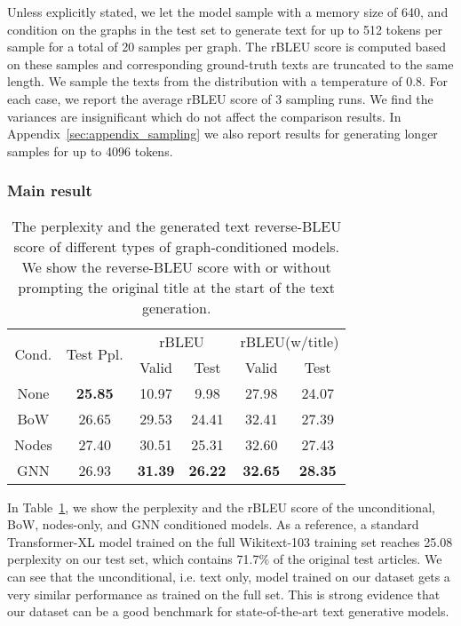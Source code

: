 \documentclass[11pt]{article}
\begin{document}
Unless explicitly stated, we let the model sample with a memory size of 640, and condition on the graphs in the test set to generate text for up to 512 tokens per sample for a total of 20 samples per graph.
The rBLEU score is computed based on these samples and corresponding ground-truth texts are truncated to the same length.  We sample the texts from the distribution with a temperature of 0.8.  For each case, we report the average rBLEU score of 3 sampling runs. We find the variances are insignificant which do not affect the comparison results. In Appendix~\ref{sec:appendix_sampling} we also report results for generating longer samples for up to 4096 tokens.


\subsubsection{Main result}



\begin{table}[t]
    \centering
    \setlength{\tabcolsep}{5pt}
    \begin{tabular}{c|c|c|c|c|c}
    \hline
        \multirow{2}{2em}{Cond.} & \multirow{2}{2em}{Test Ppl.} & \multicolumn{2}{c|}{rBLEU} & \multicolumn{2}{c}{rBLEU(w/title)} \\ \cline{3-6}
          & & Valid & Test & Valid & Test \\
        \hline
        None & \textbf{25.85} & 10.97 & 9.98 & 27.98 & 24.07 \\
        BoW & 26.65 & 29.53 & 24.41 & 32.41 & 27.39  \\
        Nodes & 27.40 & 30.51 & 25.31 & 32.60 & 27.43 \\
        GNN & 26.93 & \textbf{31.39} & \textbf{26.22} & \textbf{32.65} & \textbf{28.35} \\
        \hline
    \end{tabular}
    \caption{The perplexity and the generated text reverse-BLEU score of different types of graph-conditioned models. We show the reverse-BLEU score with or without prompting the original title at the start of the text generation.}
    \label{tab:graph2text}
\end{table}

In Table~\ref{tab:graph2text}, we show the perplexity and the rBLEU score of the unconditional, BoW, nodes-only, and GNN conditioned models.  As a reference, a standard Transformer-XL model trained on the full Wikitext-103 training set reaches 25.08 perplexity on our test set, which contains 71.7\% of the original test articles. We can see that the unconditional, i.e. text only, model trained on our dataset gets a very similar performance as trained on the full set.  This is strong evidence that our dataset can be a good benchmark for state-of-the-art text generative models.
\end{document}

